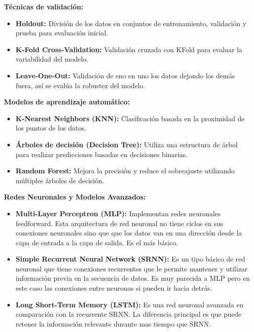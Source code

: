   \textbf{Técnicas de validación:}

  \begin{itemize}
  \tightlist
  \item
   \textbf{Holdout:} División de los datos en conjuntos de entrenamiento, validación y prueba para evaluación inicial.
  \item
   \textbf{K-Fold Cross-Validation:} Validación cruzada con KFold para evaluar la variabilidad del modelo.
  \item
   \textbf{Leave-One-Out:} Validación de eno en uno los datos dejando los demás fuera, así se evalúa la robustez del modelo. 
  \end{itemize} 
  
  \textbf{Modelos de aprendizaje automático:}

  \begin{itemize}
  \tightlist
  \item
   \textbf{K-Nearest Neighbors (KNN):} Clasificación basada en la proximidad de los puntos de los datos.
  \item
   \textbf{Árboles de decisión (Decision Tree):} Utiliza una estructura de árbol para realizar predicciones basadas en decisiones binarias.
  \item
   \textbf{Random Forest:} Mejora la precisión y reduce el sobreajuste utilizando múltiples árboles de decisión.
  \end{itemize}   

  \textbf{Redes Neuronales y Modelos Avanzados:}

  \begin{itemize}
  \tightlist
  \item
   \textbf{Multi-Layer Perceptron (MLP):} Implementan redes neuronales feedforward. Esta arquitectura de red neuronal no tiene ciclos en sus conexiones neuronales sino que que los datos van en una dirección desde la capa de entrada a la capa de salida. Es el más básico.
  \item
   \textbf{Simple Recurrent Neural Network (SRNN):} Es un tipo básico de red neuronal que tiene conexiones recurrentes que le permite mantener y utilizar información previa en la secuencia de datos. Es muy parecida a MLP pero en este caso las conexiones entre neuronas si pueden ir hacia detrás.
  \item
   \textbf{Long Short-Term Memory (LSTM):} Es una red neuronal avanzada en comparación con la recurrente SRNN. La diferencia principal es que puede retener la información relevante durante mas tiempo que SRNN.
  \end{itemize} 


